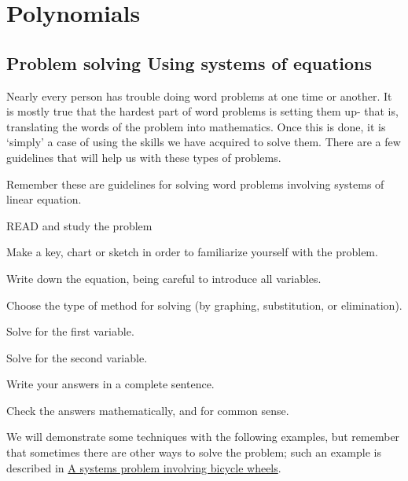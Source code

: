 \chapter{Polynomials}
\minitoc
\section{Problem solving Using systems of equations}
%
Nearly every person has trouble doing word problems at one time or another. It is mostly true that the hardest part of word problems is setting them up- that is, translating the words of the problem into mathematics. Once this is done, it is `simply' a case of using the skills we have acquired to \gls{solve} them. There are a few guidelines that will help us with these types of problems.

Remember these are guidelines for solving word problems involving systems of \gls{linear} \gls{equation}. 
\begin{steps}
	\item READ and study the problem
	\item Make a key, chart or sketch in order to familiarize yourself with the problem.
	\item Write down the equation, being careful to introduce all variables.
	\item Choose the type of method for solving (by graphing, substitution, or elimination).
	\item Solve for the first \gls{variable}. 
	\item Solve for the second variable.
	\item Write your answers in a complete sentence. 
	\item Check the answers mathematically, and for common sense.
\end{steps}
We will demonstrate some techniques with the following examples, but remember that sometimes
there are other ways to solve the problem; such an example is described in 
\href{http://math.stackexchange.com/questions/478212/is-there-another-simpler-method-to-solve-this-elementary-school-math-problem}{A systems problem involving 
bicycle wheels}.

